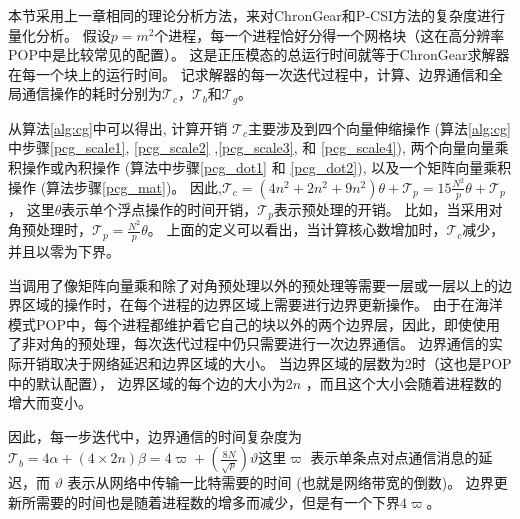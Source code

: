 本节采用上一章相同的理论分析方法，来对ChronGear和P-CSI方法的复杂度进行量化分析。
假设$p=m^2$个进程，每一个进程恰好分得一个网格块（这在高分辨率POP中是比较常见的配置）。 
这是正压模态的总运行时间就等于ChronGear求解器在每一个块上的运行时间。 
记求解器的每一次迭代过程中，计算、边界通信和全局通信操作的耗时分别为$\mathcal{T}_c$，$\mathcal{T}_b$和$\mathcal{T}_g$。 


从算法\ref{alg:cg}中可以得出, 计算开销
$\mathcal{T}_c$主要涉及到四个向量伸缩操作 (算法\ref{alg:cg}中步骤\ref{pcg_scale1}, \ref{pcg_scale2} ,\ref{pcg_scale3}, 和
\ref{pcg_scale4}), 两个向量向量乘积操作或內积操作 (算法中步骤\ref{pcg_dot1} 和 \ref{pcg_dot2}), 以及一个矩阵向量乘积操作 (算法步骤\ref{pcg_mat})。
因此,$\mathcal{T}_c= (4 n^2 +2n^2+ 9n^2)\theta + \mathcal{T}_{p}=15\frac{N^2}{p}\theta+\mathcal{T}_{p}$，
这里$\theta$表示单个浮点操作的时间开销，$\mathcal{T}_{p}$表示预处理的开销。
比如，当采用对角预处理时，$\mathcal{T}_{p} =\frac{N^2}{p}\theta$。
上面的定义可以看出，当计算核心数增加时，$\mathcal{T}_c$减少，并且以零为下界。

 
当调用了像矩阵向量乘和除了对角预处理以外的预处理等需要一层或一层以上的边界区域的操作时，在每个进程的边界区域上需要进行边界更新操作。 
由于在海洋模式POP中，每个进程都维护着它自己的块以外的两个边界层，因此，即使使用了非对角的预处理，每次迭代过程中仍只需要进行一次边界通信。
边界通信的实际开销取决于网络延迟和边界区域的大小。 当边界区域的层数为2时（这也是POP中的默认配置）， 边界区域的每个边的大小为$2n$ ，而且这个大小会随着进程数的增大而变小。 
 
因此，每一步迭代中，边界通信的时间复杂度为$\mathcal{T}_b =4\alpha +(4\times 2n)\beta=4\varpi +(\frac{8N}{\sqrt{p}})\vartheta $这里$\varpi$ 表示单条点对点通信消息的延迟，而
$\vartheta$ 表示从网络中传输一比特需要的时间 (也就是网络带宽的倒数)。
边界更新所需要的时间也是随着进程数的增多而减少，但是有一个下界$4\varpi$。 

